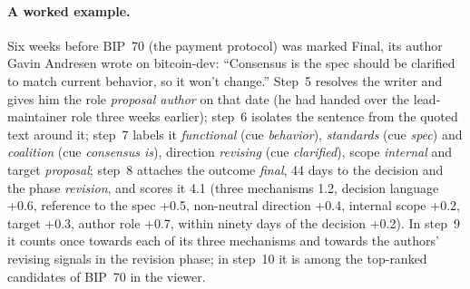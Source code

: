 \paragraph{A worked example.} Six weeks before BIP~70 (the payment protocol) was marked Final, its author Gavin Andresen wrote on bitcoin-dev: ``Consensus is the spec should be clarified to match current behavior, so it won't change.'' Step~5 resolves the writer and gives him the role \emph{proposal author} on that date (he had handed over the lead-maintainer role three weeks earlier); step~6 isolates the sentence from the quoted text around it; step~7 labels it \emph{functional} (cue \emph{behavior}), \emph{standards} (cue \emph{spec}) and \emph{coalition} (cue \emph{consensus is}), direction \emph{revising} (cue \emph{clarified}), scope \emph{internal} and target \emph{proposal}; step~8 attaches the outcome \emph{final}, 44 days to the decision and the phase \emph{revision}, and scores it 4.1 (three mechanisms 1.2, decision language +0.6, reference to the spec +0.5, non-neutral direction +0.4, internal scope +0.2, target +0.3, author role +0.7, within ninety days of the decision +0.2). In step~9 it counts once towards each of its three mechanisms and towards the authors' revising signals in the revision phase; in step~10 it is among the top-ranked candidates of BIP~70 in the viewer.
